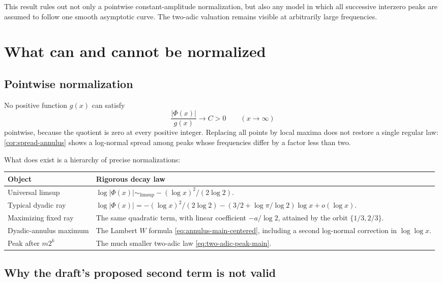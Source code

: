 \documentclass[11pt,oneside]{article}
\theoremstyle{definition}
\theoremstyle{remark}
\newcommand{\smallo}{o}
\newcommand{\PhiF}{\Phi}
\begin{document}
This result rules out not only a pointwise constant-amplitude normalization,
but also any model in which all successive interzero peaks are assumed to
follow one smooth asymptotic curve.  The two-adic valuation remains visible
at arbitrarily large frequencies.

\section{What can and cannot be normalized}
\label{sec:normalization}

\subsection{Pointwise normalization}

No positive function \(g(x)\) can satisfy
\[
 \frac{|\PhiF(x)|}{g(x)}\longrightarrow C>0
 \qquad(x\to\infty)
\]
pointwise, because the quotient is zero at every positive integer.  Replacing
all points by local maxima does not restore a single regular law:
\cref{cor:spread-annulus} shows a log-normal spread among peaks whose
frequencies differ by a factor less than two.

What does exist is a hierarchy of precise normalizations:
\begin{center}
\begin{tabularx}{0.96\textwidth}{@{}>{\raggedright\arraybackslash}p{}X@{}}
\toprule
Object & Rigorous decay law \\
\midrule
Universal limsup &
\(\log|\PhiF(x)|\sim_{\limsup}-(\log x)^2/(2\log2)\).\\[0.4em]
Typical dyadic ray &
\(\log|\PhiF(x)|=-(\log x)^2/(2\log2)
 -(3/2+\log\pi/\log2)\log x+\smallo(\log x)\).\\[0.4em]
Maximizing fixed ray &
The same quadratic term, with linear coefficient
\(-a/\log2\), attained by the orbit \(\{1/3,2/3\}\).\\[0.4em]
Dyadic-annulus maximum &
The Lambert \(W\) formula \eqref{eq:annulus-main-centered}, including a
second log-normal correction in \(\log\log x\).\\[0.4em]
Peak after \(m2^k\) &
The much smaller two-adic law \eqref{eq:two-adic-peak-main}.\\
\bottomrule
\end{tabularx}
\end{center}

\subsection{Why the draft's proposed second term is not valid}
\end{document}
